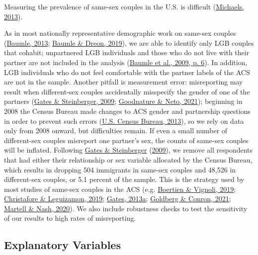 \documentclass[
  11pt,
]{article}
\begin{document}
Measuring the prevalence of same-sex couples in the U.S. is difficult (\protect\hyperlink{ref-michaels_2013}{Michaels, 2013}).

As in most nationally representative demographic work on same-sex couples (\protect\hyperlink{ref-baumle_2013}{Baumle, 2013}; \protect\hyperlink{ref-baumle_2019}{Baumle \& Dreon, 2019}), we are able to identify only LGB couples that cohabit; unpartnered LGB individuals and those who do not live with their partner are not included in the analysis (\protect\hyperlink{ref-baumle_2009}{Baumle et al., 2009, p. 6}). In addition, LGB individuals who do not feel comfortable with the partner labels of the ACS are not in the sample. Another pitfall is measurement error: misreporting may result when different-sex couples accidentally misspecify the gender of one of the partners (\protect\hyperlink{ref-gates_2009}{Gates \& Steinberger, 2009}; \protect\hyperlink{ref-goodnature_2021}{Goodnature \& Neto, 2021}); beginning in 2008 the Census Bureau made changes to ACS gender and partnership questions in order to prevent such errors (\protect\hyperlink{ref-u.s.censusbureau_2013}{U.S. Census Bureau, 2013}), so we rely on data only from 2008 onward, but difficulties remain. If even a small number of different-sex couples misreport one partner's sex, the counts of same-sex couples will be inflated. Following \protect\hyperlink{ref-gates_2009}{Gates \& Steinberger} (\protect\hyperlink{ref-gates_2009}{2009}), we remove all respondents that had either their relationship or sex variable allocated by the Census Bureau, which results in dropping 504 immigrants in same-sex couples and 48,526 in different-sex couples, or 5.1 percent of the sample. This is the strategy used by most studies of same-sex couples in the ACS (e.g. \protect\hyperlink{ref-boertien_2019}{Boertien \& Vignoli, 2019}; \protect\hyperlink{ref-christafore_2019}{Christafore \& Leguizamon, 2019}; \protect\hyperlink{ref-gates_2013}{Gates, 2013a}; \protect\hyperlink{ref-goldberg_2021}{Goldberg \& Conron, 2021}; \protect\hyperlink{ref-martell_2020}{Martell \& Nash, 2020}). We also include robustness checks to test the sensitivity of our results to high rates of misreporting.

\hypertarget{explanatory-variables}{%
\subsection{Explanatory Variables}\label{explanatory-variables}}
\end{document}
